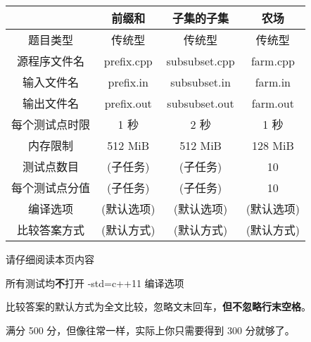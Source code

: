 \documentclass[UTF8]{article}
\title{\insertsubject}
\author{\insertauthor}
\date{\today}
\begin{document}
	\maketitle

	\begin{center}
		\setlength{\tabcolsep}{7mm}
		{
			\begin{tabular}{cccc}
				\toprule
					& 前缀和 & 子集的子集 & 农场 \\
					\hline
					题目类型 & 传统型 & 传统型 & 传统型 \\
					源程序文件名 & prefix.cpp & subsubset.cpp & farm.cpp \\
					输入文件名 & prefix.in & subsubset.in & farm.in \\
					输出文件名 & prefix.out & subsubset.out & farm.out \\
					每个测试点时限 & 1 秒 & 2 秒 & 1 秒 \\
					内存限制 & 512 MiB & 512 MiB & 128 MiB \\
					测试点数目 & (子任务) & (子任务) & 10 \\
					每个测试点分值 & (子任务) & (子任务) & 10 \\
					编译选项 & (默认选项) & (默认选项) & (默认选项) \\
					比较答案方式 & (默认方式) & (默认方式) & (默认方式) \\
				\bottomrule
			\end{tabular}
		}
	\end{center}

	\begin{center}
		\begin{Large}
		请仔细阅读本页内容
		\end{Large}
	\end{center}

	\begin{center}
		\begin{Large}
		所有测试均\textbf{不}打开 -std=c++11 编译选项
		\end{Large}
	\end{center}

	\begin{center}
		\begin{Large}
		比较答案的默认方式为全文比较，忽略文末回车，\textbf{但不忽略行末空格}。
		\end{Large}
	\end{center}

	\begin{center}
		\begin{Large}
			满分 500 分，但像往常一样，实际上你只需要得到 300 分就够了。
		\end{Large}
	\end{center}
\end{document}
